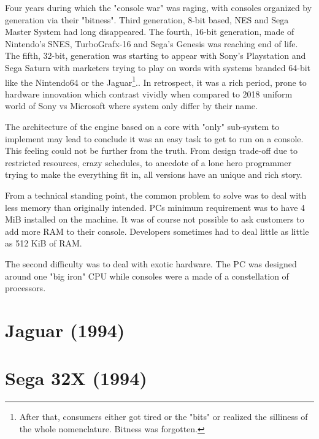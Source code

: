 Four years during which the "console war" was raging, with consoles organized by generation via their "bitness". Third generation, 8-bit based, NES and Sega Master System had long disappeared. The fourth, 16-bit generation, made of Nintendo's SNES, TurboGrafx-16 and Sega's Genesis was reaching end of life. The fifth, 32-bit, generation 
was starting to appear with Sony's Playstation and Sega Saturn with marketers trying to play on words with systems branded 64-bit like the Nintendo64 or the Jaguar\footnote{After that, consumers either got tired or the "bits" or realized the silliness of the whole nomenclature. Bitness was forgotten.}.. In retrospect, it was a rich period, prone to hardware innovation which contrast vividly when compared to 2018 uniform world of Sony vs Microsoft where system only differ by their name.\\
\par
The architecture of the engine based on a core with "only" sub-system to implement may lead to conclude it was an easy task to get \doom to run on a console. This feeling could not be further from the truth. From design trade-off due to restricted resources, crazy schedules, to anecdote of a lone hero programmer trying to make the everything fit in, all versions have an unique and rich story.\\
\par
From a technical standing point, the common problem to solve was to deal with less memory than originally intended. PCs minimum requirement was to have 4 MiB installed on the machine. It was of course not possible to ask customers to add more RAM to their console. Developers sometimes had to deal little as little as 512 KiB of RAM.\\
\par
The second difficulty was to deal with exotic hardware. The PC was designed around one "big iron" CPU while consoles were a made of a constellation of processors.












\section{Jaguar (1994)}
 




\section{Sega 32X (1994)}
 






